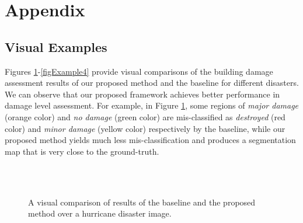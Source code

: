 \documentclass{article}
\begin{document}













\clearpage
\appendix
\section{Appendix}


\subsection{Visual Examples}
Figures \ref{figExample1}-\ref{figExample4} provide visual comparisons of the building damage assessment results of our proposed method and the baseline for different disasters. We can observe that our proposed framework achieves better performance in damage level assessment. For example, in Figure \ref{figExample1}, some regions of \textit{major damage} (orange color) and \textit{no damage} (green color) are mis-classified as \textit{destroyed} (red color) and \textit{minor damage} (yellow color) respectively by the baseline, while our proposed method yields much less mis-classification and produces a segmentation map that is very close to the ground-truth.

\begin{figure}[h]
\centering
     \\
    \vspace{-0.2cm}
      \\
    \vspace{-0.2cm}
	\caption{A visual comparison of results of the baseline and the proposed method over a hurricane disaster image. }
\label{figExample1}
\end{figure}
\end{document}
